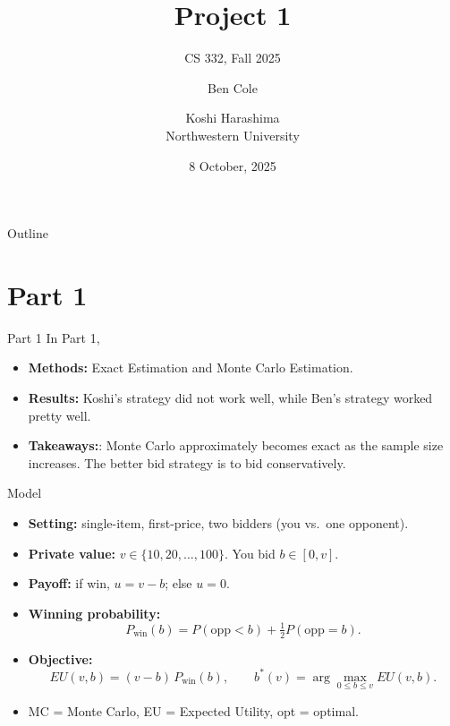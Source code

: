 \documentclass{beamer}
\title[Project 1]{Project 1}
\subtitle{CS 332, Fall 2025}
\author{Ben Cole \and Koshi Harashima\\ Northwestern University}
\date{8 October, 2025}
\begin{document}
\maketitle

\begin{frame}{Outline}
  \tableofcontents
\end{frame}


\section{Part 1}

\begin{frame}{Part 1}
In Part 1, 
\medskip
\begin{itemize}
  \item \textbf{Methods:} Exact Estimation and Monte Carlo Estimation.
  \item \textbf{Results:} Koshi's strategy did not work well, while Ben's strategy worked pretty well.
  \item \textbf{Takeaways:}: Monte Carlo approximately becomes exact as the sample size increases. The better bid strategy is to bid conservatively.
\end{itemize}
\end{frame}


\begin{frame}{Model}
\medskip
\begin{itemize}
  \item \textbf{Setting:} single-item, first-price, two bidders (you vs.\ one opponent).
  \item \textbf{Private value:} $v\in\{10,20,\dots,100\}$. You bid $b\in[0,v]$.
  \item \textbf{Payoff:} if win, $u=v-b$; else $u=0$.
  \item \textbf{Winning probability:}
    \[
      P_{\text{win}}(b)=P(\text{opp}<b)+\tfrac12P(\text{opp}=b).
    \]
  \item \textbf{Objective:}
    \[
      EU(v,b)=(v-b)\,P_{\text{win}}(b),\qquad b^*(v)=\arg\max_{0\le b\le v}EU(v,b).
    \]
  \item MC = Monte Carlo,\; EU = Expected Utility,\; opt = optimal.
\end{itemize}
\end{frame}
\end{document}
